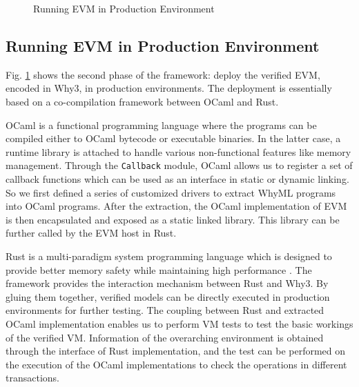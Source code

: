 \documentclass[runningheads]{llncs}
\begin{document}
\begin{figure}[t]
  \centering
  \caption{Running EVM in Production Environment}
   \label{fig2}
\end{figure}

\subsection{Running EVM in Production Environment}
Fig. \ref{fig2} shows the second phase of the framework: deploy the verified EVM, encoded in Why3, in production environments. The deployment is essentially based on a co-compilation framework between OCaml and Rust.

OCaml is a functional programming language where the programs can be compiled either to OCaml bytecode or executable binaries. In the latter case, a runtime library is attached to handle various non-functional features like memory management. Through the \texttt{Callback} module, OCaml allows us to register a set of callback functions which can be used as an interface in static or dynamic linking. 
So we first defined a series of customized drivers to extract WhyML programs into OCaml programs. After the extraction, the OCaml implementation of EVM is then encapsulated and exposed as a static linked library. This library can be further called by the EVM host in Rust.

Rust is a multi-paradigm system programming language which is designed to provide better memory safety while maintaining high performance \cite{LBHN16}.
The framework provides the interaction mechanism between Rust and Why3. By gluing them together, verified models can be directly executed in production environments for further testing. The coupling between Rust and extracted OCaml implementation enables us to perform VM tests to test the basic workings of the verified VM. Information of the overarching environment is obtained through the interface of Rust implementation, and the test can be performed on the execution of the OCaml implementations to check the operations in different transactions.    
\end{document}
